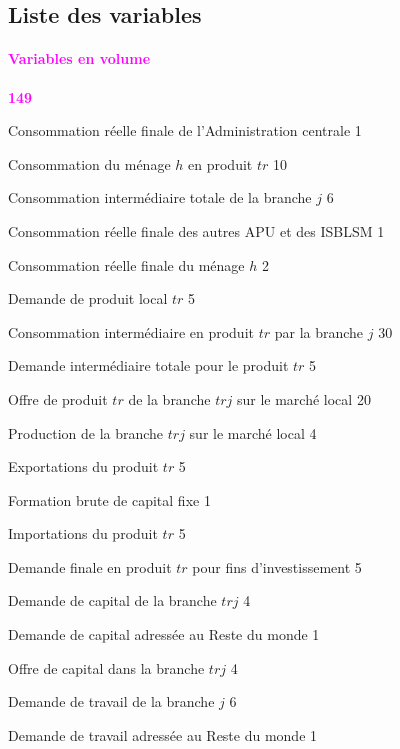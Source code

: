 \documentclass[11pt,a4paper]{article}
\newcommand{\tr}{\mathit{tr}}
\newcommand{\trj}{\mathit{trj}}
\newcommand{\CG}{\mathit{CG}}
\newcommand{\CH}{\mathit{CH}}
\newcommand{\CI}{\mathit{CI}}
\newcommand{\CNGO}{\mathit{CNGO}}
\newcommand{\CTH}{\mathit{CTH}}
\newcommand{\DD}{\mathit{DD}}
\newcommand{\DI}{\mathit{DI}}
\newcommand{\DIT}{\mathit{DIT}}
\newcommand{\DS}{\mathit{DS}}
\newcommand{\DX}{\mathit{DX}}
\newcommand{\EX}{\mathit{EX}}
\newcommand{\FBCF}{\mathit{FBCF}}
\newcommand{\IM}{\mathit{IM}}
\newcommand{\INV}{\mathit{INV}}
\newcommand{\KD}{\mathit{KD}}
\newcommand{\KS}{\mathit{KS}}
\newcommand{\LD}{\mathit{LD}}
\newcommand{\redparagraph}[1]{\paragraph*{\large\textcolor{Fuchsia}{#1}}}
\begin{document}
	\subsection{Liste des variables}
	\redparagraph{Variables en volume}\hfill \textcolor{Fuchsia}{\textbf{149}} 
	\begin{description}[leftmargin=!,labelwidth=\widthof{\bfseries AAAAAAAA},parsep=9.7pt]
		\item[$\CG$] 			Consommation réelle finale de l'Administration centrale 		\hfill 1
		\item[$\CH_{\tr,h}$]	Consommation du ménage $h$ en produit $\tr$ 					\hfill 10
		\item[$\CI_j$]      	Consommation intermédiaire totale de la branche $j$ 			\hfill 6
		\item[$\CNGO$] 			Consommation réelle finale des autres APU et des ISBLSM 		\hfill 1
		\item[$\CTH_h^{\mathit{reel}}$]	Consommation réelle finale du ménage  $h$ 				\hfill 2
		\item[$\DD_{\tr}$]		Demande de produit local $\tr$ 									\hfill 5
		\item[$\DI_{\tr,j}$]	Consommation intermédiaire en produit $\tr$ par la branche $j$ 	\hfill 30
		\item[$\DIT_{\tr}$]		Demande intermédiaire totale pour le produit $\tr$ 				\hfill 5
		\item[$\DS_{\tr,\trj}$]	Offre de produit $\tr$ de la branche $\trj$ sur le marché local \hfill 20
		\item[$\DX_{\trj}$]		Production de la branche $\trj$ sur le marché local 			\hfill 4
		\item[$\EX_{\tr}$]		Exportations du produit $\tr$ 		\hfill 5
		\item[$\FBCF^{\mathit{reel}}$]			Formation brute de capital fixe 	\hfill 1
		\item[$\IM_{\tr}$]		Importations du produit $\tr$ 	\hfill 5
		\item[$\INV_{\tr}$]		Demande finale en produit $\tr$ pour fins d'investissement 	\hfill 5
		\item[$\KD_{\trj}$]		Demande de capital de la branche $\trj$ 		\hfill 4
		\item[$\KD^R$]			Demande de capital adressée au Reste du monde 	\hfill 1
		\item[$\KS_{\trj}$]		Offre de capital dans la branche $\trj$ 		\hfill 4
		\item[$\LD_{j}$]		Demande de travail de la branche $j$ 		\hfill 6
		\item[$\LD^R$]			Demande de travail adressée au Reste du monde 	\hfill 1

\end{description}
\end{document}
